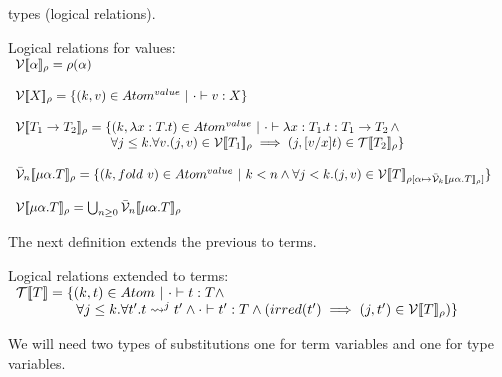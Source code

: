 types (logical relations).  
\begin{definition}
  \label{def:logical_relations}
  Logical relations for values: \\
  \begin{math}
    \begin{array}{lllll}
      \vinterp{\alpha}_\rho = \rho(\alpha) \\
      & \\
      \vinterp{X}_\rho =  \{ (k,v) \in Atom^{value}\ |\ \cdot \vdash v : X \} \\
      & \\
      \vinterp{T_1 \to T_2}_\rho = \{ (k, \lambda x:T.t) \in Atom^{value}\ |\ 
      \cdot \vdash \lambda x:T_1.t : T_1 \to T_2 \,\land \\
      \,\,\,\,\,\,\,\,\,\,\,\,\,\,\,
      \,\,\,\,\,\,\,\,\,\,\,\,\,\,\,
      \,\,\,\,\,\,\,\,\,\,\,\,\,\,
      \forall j \leq k.\forall v.(j, v) \in \vinterp{T_1}_\rho \implies 
              (j, [v/x]t) \in \tinterp{T_2}_{\rho} \}\\
      & \\
      \vbinterp{n}{\mu \alpha.T}_\rho = \{ (k,fold\ v) \in Atom^{value}\ |\ 
        k < n \land \forall j < k.(j,v) \in 
        \vinterp{T}_{\rho[\alpha \mapsto \vbinterp{k}{\mu \alpha.T}_\rho]}\}\\
      & \\
      \vinterp{\mu \alpha.T}_\rho = \bigcup_{n \geq 0} \vbinterp{n}{\mu \alpha.T}_\rho
    \end{array}
  \end{math}
\end{definition}
\noindent
The next definition extends the previous to terms.
\begin{definition}
  \label{def:lr_extended_to_terms}
    Logical relations extended to terms:\\
  \begin{math}
    \begin{array}{lll}
      \mathcal{T}[\negthinspace[T]\negthinspace] = \{ (k,t) \in Atom\ |\ \cdot \vdash t:T \land \\
      \,\,\,\,\,\,\,\,\,\,\,\,\,\,\,
      \,\,\,\,\,\,\,\,\,\,\,
      \forall j \leq k.\forall t'.t \rightsquigarrow^j t' \land \cdot \vdash t':T \land 
      (irred(t') \implies (j,t') \in \mathcal{V}[\negthinspace[T]\negthinspace]_\rho) \}
    \end{array}
  \end{math}
\end{definition}
\noindent
We will need two types of substitutions one for term variables and one for type variables.
